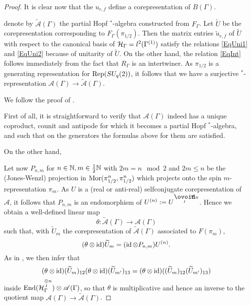 \begin{proof}
It is clear now that the $u_{e,f}$ define a corepresentation of $B(\Gamma)$. 



 denote by $\widetilde{\mathscr{A}}(\Gamma)$ the partial Hopf $^*$-algebra constructed from $F_{\Gamma}$. Let $\widetilde{U}$ be the corepresentation corresponding to $F_{\Gamma}(\pi_{1/2})$. Then the matrix entries $\widetilde{u}_{e,f}$ of $\widetilde{U}$ with respect to  the canonical basis of $\mathcal{H}_{\Gamma} = l^2(\Gamma^{(1)})$ satisfy the relations \eqref{EqUni1} and \eqref{EqUni2} because of unitarity of $\widetilde{U}$. On the other hand, the relation \eqref{EqInt} follows immediately from the fact that $R_{\Gamma}$ is an intertwiner. As $\pi_{1/2}$ is a generating representation for $\mathrm{Rep}(SU_q(2))$, it follows that we have a surjective $^*$-representation $\mathscr{A}(\Gamma)\rightarrow \widetilde{\mathscr{A}}(\Gamma)$.



We follow the proof of \cite[Theorem 5.5]{BDV1}.

First of all, it is straightforward to verify that $\mathscr{A}(\Gamma)$ indeed has a unique coproduct, counit and antipode for which it becomes a partial Hopf $^*$-algebra, and such that on the generators the formulas above for them are satisfied.%

On the other hand,

Let now $P_{n,m}$ for $n\in \mathbb{N},m\in \frac{1}{2}\mathbb{N}$ with $2m = n \mod 2$ and $2m\leq n$ be the (Jones-Wenzl) projection in $\mathrm{Mor}(\pi_{1/2}^{n},\pi_{1/2}^{n})$ which projects onto the spin $m$-representation $\pi_m$. As $U$ is a (real or anti-real) selfconjugate corepresentation of $\mathscr{A}$, it follows that $P_{n,m}$ is an endomorphism of $U^{(n)} := U^{\Circt n}$. Hence we obtain a well-defined linear map \[\theta: \widetilde{\mathscr{A}}(\Gamma)\rightarrow \mathscr{A}(\Gamma)\] such that, with $\widetilde{U}_m$ the corepresentation of $\widetilde{\mathscr{A}}(\Gamma)$ associated to $F(\pi_m)$,  \[ (\theta\otimes \operatorname{id})\widetilde{U}_m = (\operatorname{id}\otimes P_{n,m})U^{(n)}.\]
As in \cite{BDV1}, we then infer that \[(\theta\otimes\operatorname{id})(\widetilde{U}_m)_{12}(\theta\otimes\operatorname{id})(\widetilde{U}_{m'})_{13} = (\theta\otimes\operatorname{id})((\widetilde{U}_m)_{12}(\widetilde{U}_{m'})_{13})\] inside $\operatorname{\mathrm{End}}(\mathcal{H}_{\Gamma}^{\underset{I}{\otimes} n})\otimes \mathscr{A}(\Gamma)$, so that $\theta$ is multiplicative and hence an inverse to the quotient map  $\mathscr{A}(\Gamma)\rightarrow \widetilde{\mathscr{A}}(\Gamma)$.
\end{proof}



